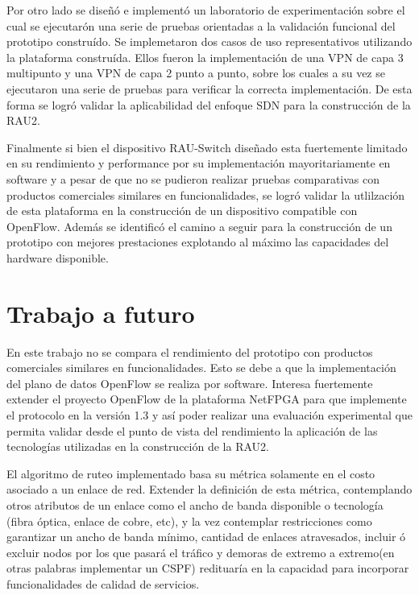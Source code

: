 Por otro lado se diseñ\'o e implement\'o un laboratorio de experimentaci\'on sobre el cual se ejecutar\'on una serie de pruebas orientadas a la validaci\'on funcional del prototipo constru\'ido. Se implemetaron dos casos de uso representativos utilizando la plataforma constru\'ida. Ellos fueron la implementaci\'on de una VPN de capa 3 multipunto y una VPN de capa 2 punto a punto, sobre los cuales a su vez se ejecutaron una serie de pruebas para verificar la correcta implementaci\'on. De esta forma se logr\'o validar la aplicabilidad del enfoque SDN para la construcci\'on de la RAU2.

Finalmente si bien el dispositivo RAU-Switch diseñado esta fuertemente limitado en su rendimiento y performance por su implementaci\'on mayoritariamente en software y a pesar de que no se pudieron realizar pruebas comparativas con productos comerciales similares en funcionalidades, se logr\'o validar la utlilzaci\'on de esta plataforma en la construcci\'on de un dispositivo compatible con OpenFlow. Adem\'as se identific\'o el camino a seguir para la construcci\'on de un prototipo con mejores prestaciones explotando al m\'aximo las capacidades del hardware disponible.  

\section{Trabajo a futuro}
En este trabajo no se compara el rendimiento del prototipo con productos comerciales similares en funcionalidades. Esto se debe a que la implementaci\'on del plano de datos OpenFlow se realiza por software. Interesa fuertemente extender el proyecto OpenFlow de la plataforma NetFPGA para que implemente el protocolo en la versi\'on 1.3 y as\'i poder realizar una evaluaci\'on experimental que permita validar desde el punto de vista del rendimiento la aplicaci\'on de las tecnolog\'ias utilizadas en la construcci\'on de la RAU2.

El algoritmo de ruteo implementado basa su m\'etrica solamente en el costo asociado a un enlace de red. Extender la definici\'on de esta m\'etrica, contemplando otros atributos de un enlace como el ancho de banda disponible o tecnolog\'ia (fibra \'optica, enlace de cobre, etc), y la vez contemplar restricciones como garantizar un ancho de banda m\'inimo, cantidad de enlaces atravesados, incluir \'o excluir nodos por los que pasar\'a el tr\'afico y demoras de extremo a extremo(en otras palabras implementar un CSPF) redituaría en la capacidad para incorporar funcionalidades de calidad de servicios.

